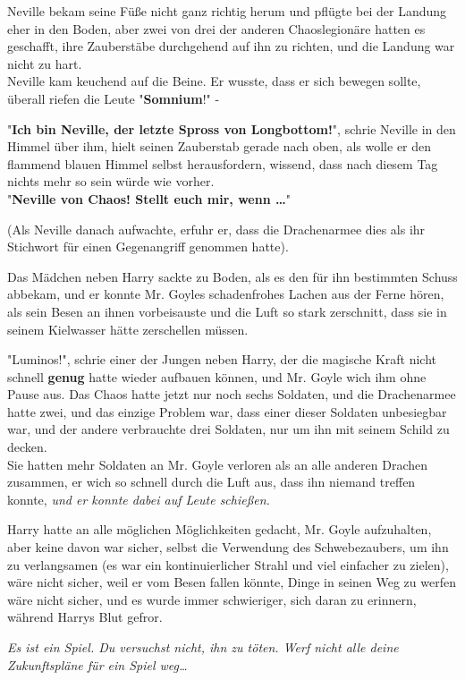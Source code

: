 {Neville bekam seine Füße nicht ganz richtig herum und pflügte bei der Landung eher in den Boden, aber zwei von drei der anderen Chaoslegionäre hatten es geschafft, ihre Zauberstäbe durchgehend auf ihn zu richten, und die Landung war nicht zu hart.\\ Neville kam keuchend auf die Beine. Er wusste, dass er sich bewegen sollte, überall riefen die Leute "\textbf{Somnium}!" -

"\textbf{Ich bin Neville, der letzte Spross von Longbottom!}", schrie Neville in den Himmel über ihm, hielt seinen Zauberstab gerade nach oben, als wolle er den flammend blauen Himmel selbst herausfordern, wissend, dass nach diesem Tag nichts mehr so sein würde wie vorher.\\ "\textbf{Neville von Chaos! Stellt euch mir, wenn …}"

(Als Neville danach aufwachte, erfuhr er, dass die Drachenarmee dies als ihr Stichwort für einen Gegenangriff genommen hatte).

Das Mädchen neben Harry sackte zu Boden, als es den für ihn bestimmten Schuss abbekam, und er konnte Mr. Goyles schadenfrohes Lachen aus der Ferne hören, als sein Besen an ihnen vorbeisauste und die Luft so stark zerschnitt, dass sie in seinem Kielwasser hätte zerschellen müssen.

"Luminos!", schrie einer der Jungen neben Harry, der die magische Kraft nicht schnell \textbf{genug} hatte wieder aufbauen können, und Mr. Goyle wich ihm ohne Pause aus. Das Chaos hatte jetzt nur noch sechs Soldaten, und die Drachenarmee hatte zwei, und das einzige Problem war, dass einer dieser Soldaten unbesiegbar war, und der andere verbrauchte drei Soldaten, nur um ihn mit seinem Schild zu decken.\\ Sie hatten mehr Soldaten an Mr. Goyle verloren als an alle anderen Drachen zusammen, er wich so schnell durch die Luft aus, dass ihn niemand treffen konnte, \emph{und er konnte dabei auf Leute schießen.}

Harry hatte an alle möglichen Möglichkeiten gedacht, Mr. Goyle aufzuhalten, aber keine davon war sicher, selbst die Verwendung des Schwebezaubers, um ihn zu verlangsamen (es war ein kontinuierlicher Strahl und viel einfacher zu zielen), wäre nicht sicher, weil er vom Besen fallen könnte, Dinge in seinen Weg zu werfen wäre nicht sicher, und es wurde immer schwieriger, sich daran zu erinnern, während Harrys Blut gefror.

\emph{Es ist ein Spiel. Du versuchst nicht, ihn zu töten. Werf nicht alle deine Zukunftspläne für ein Spiel weg…}

}
